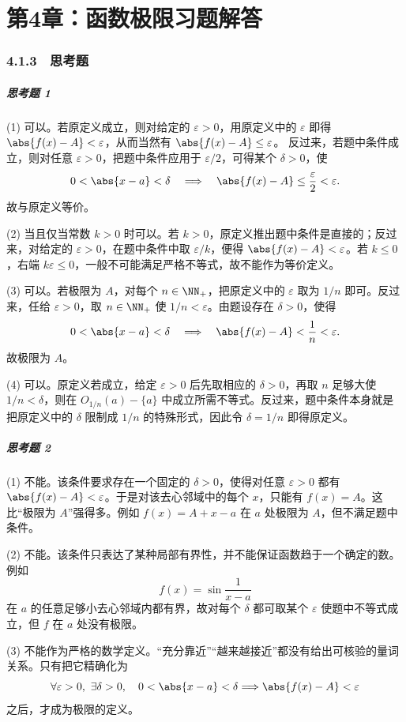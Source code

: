 
\chapter*{第4章：函数极限习题解答}
\subsection*{4.1.3　思考题}

\paragraph{思考题 1}
\begin{xsolution}
(1) 可以。若原定义成立，则对给定的 $\varepsilon>0$，用原定义中的 $\varepsilon$ 即得
$\abs{f(x)-A}<\varepsilon$，从而当然有 $\abs{f(x)-A}\leq\varepsilon$。
反过来，若题中条件成立，则对任意 $\varepsilon>0$，把题中条件应用于 $\varepsilon/2$，可得某个 $\delta>0$，使
\[
  0<\abs{x-a}<\delta\quad\Longrightarrow\quad
  \abs{f(x)-A}\leq\frac\varepsilon2<\varepsilon.
\]
故与原定义等价。

(2) 当且仅当常数 $k>0$ 时可以。若 $k>0$，原定义推出题中条件是直接的；反过来，对给定的 $\varepsilon>0$，在题中条件中取 $\varepsilon/k$，便得
$\abs{f(x)-A}<\varepsilon$。若 $k\leq0$，右端 $k\varepsilon\leq0$，一般不可能满足严格不等式，故不能作为等价定义。

(3) 可以。若极限为 $A$，对每个 $n\in\NN_+$，把原定义中的 $\varepsilon$ 取为 $1/n$ 即可。反过来，任给 $\varepsilon>0$，取 $n\in\NN_+$ 使 $1/n<\varepsilon$。由题设存在 $\delta>0$，使得
\[
  0<\abs{x-a}<\delta\quad\Longrightarrow\quad
  \abs{f(x)-A}<\frac1n<\varepsilon.
\]
故极限为 $A$。

(4) 可以。原定义若成立，给定 $\varepsilon>0$ 后先取相应的 $\delta>0$，再取 $n$ 足够大使 $1/n<\delta$，则在 $O_{1/n}(a)-\{a\}$ 中成立所需不等式。反过来，题中条件本身就是把原定义中的 $\delta$ 限制成 $1/n$ 的特殊形式，因此令 $\delta=1/n$ 即得原定义。
\end{xsolution}

\paragraph{思考题 2}
\begin{xsolution}
(1) 不能。该条件要求存在一个固定的 $\delta>0$，使得对任意 $\varepsilon>0$ 都有
$\abs{f(x)-A}<\varepsilon$。于是对该去心邻域中的每个 $x$，只能有 $f(x)=A$。这比“极限为 $A$”强得多。例如 $f(x)=A+x-a$ 在 $a$ 处极限为 $A$，但不满足题中条件。

(2) 不能。该条件只表达了某种局部有界性，并不能保证函数趋于一个确定的数。例如
\[
  f(x)=\sin\frac1{x-a}
\]
在 $a$ 的任意足够小去心邻域内都有界，故对每个 $\delta$ 都可取某个 $\varepsilon$ 使题中不等式成立，但 $f$ 在 $a$ 处没有极限。

(3) 不能作为严格的数学定义。“充分靠近”“越来越接近”都没有给出可核验的量词关系。只有把它精确化为
\[
  \forall\varepsilon>0,\ \exists\delta>0,\quad
  0<\abs{x-a}<\delta\Longrightarrow\abs{f(x)-A}<\varepsilon
\]
之后，才成为极限的定义。
\end{xsolution}

